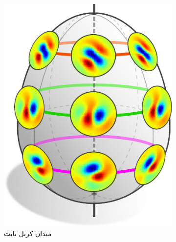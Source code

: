 \begin{figure}
	\hspace{1.ex}
	\begin{subfigure}[b]{0.24\textwidth}
		\includegraphics[width=.92\textwidth]{figures/isometry_egg_intro_symmetric.pdf}
		\vspace*{-.5ex}
		\captionsetup{format=hang, width=.7\textwidth}
		\caption{\small
			میدان کرنل ثابت 
		}
		\label{fig:isom_invariant_kernel_field_intro_SO2}
	\end{subfigure}
	\hspace*{1.5ex}
	\begin{subfigure}[b]{0.24\textwidth}

\end{subfigure}
\end{figure}
